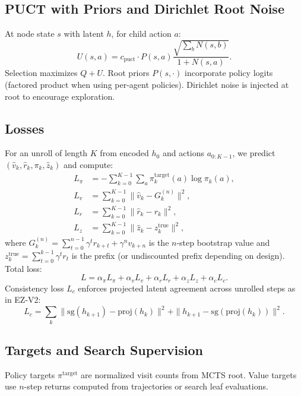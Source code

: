 \documentclass{article}
\begin{document}
\subsection{PUCT with Priors and Dirichlet Root Noise}
At node state $s$ with latent $h$, for child action $a$:
\begin{equation}
U(s,a) = c_{\text{puct}} \cdot P(s,a)\frac{\sqrt{\sum_b N(s,b)}}{1+N(s,a)} .
\end{equation}
Selection maximizes $Q+U$. Root priors $P(s,\cdot)$ incorporate policy logits (factored product when using per-agent policies). Dirichlet noise is injected at root to encourage exploration.

\subsection{Losses}
For an unroll of length $K$ from encoded $h_0$ and actions $a_{0:K-1}$, we predict $(\hat v_k,\hat r_k,\pi_k,\hat z_k)$ and compute:
\begin{align}
L_\pi &= -\sum_{k=0}^{K-1}\sum_a \pi^{\text{target}}_k(a)\log \pi_k(a),\\
L_v &= \sum_{k=0}^{K-1} \|\hat v_k - G_k^{(n)}\|^2,\\
L_r &= \sum_{k=0}^{K-1} \|\hat r_k - r_k\|^2,\\
L_z &= \sum_{k=0}^{K-1} \|\hat z_k - z^{\text{true}}_k\|^2,
\end{align}
where $G_k^{(n)}=\sum_{t=0}^{n-1}\gamma^t r_{k+t}+\gamma^n v_{k+n}$ is the $n$-step bootstrap value and $z^{\text{true}}_k=\sum_{t=0}^{k-1}\gamma^t r_t$ is the prefix (or undiscounted prefix depending on design).
Total loss:
\begin{equation}
L = \alpha_\pi L_\pi + \alpha_v L_v + \alpha_r L_r + \alpha_z L_z + \alpha_c L_c .
\end{equation}
Consistency loss $L_c$ enforces projected latent agreement across unrolled steps as in EZ-V2:
\begin{equation}
L_c = \sum_{k}\|\mathrm{sg}(h_{k+1}) - \mathrm{proj}(h_k)\|^2 + \|h_{k+1} - \mathrm{sg}(\mathrm{proj}(h_k))\|^2.
\end{equation}

\subsection{Targets and Search Supervision}
Policy targets $\pi^{\text{target}}$ are normalized visit counts from MCTS root. Value targets use $n$-step returns computed from trajectories or search leaf evaluations.
\end{document}
